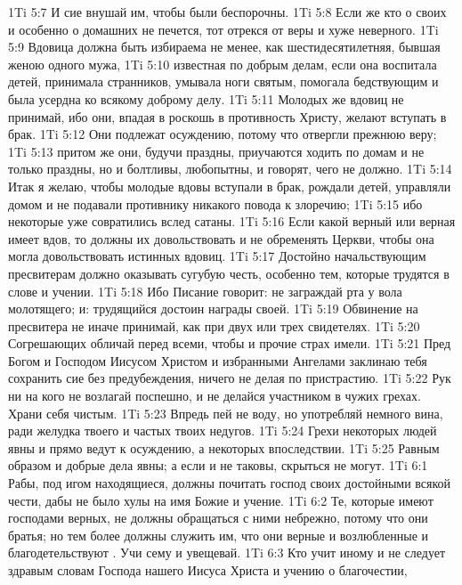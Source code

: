 \vs 1Ti 5:7 И сие внушай им, чтобы были беспорочны.
\vs 1Ti 5:8 Если же кто о своих и особенно о домашних не печется, тот отрекся от веры и хуже неверного.
\vs 1Ti 5:9 Вдовица должна быть избираема не менее, как шестидесятилетняя, бывшая женою одного мужа,
\vs 1Ti 5:10 известная по добрым делам, если она воспитала детей, принимала странников, умывала ноги святым, помогала бедствующим и была усердна ко всякому доброму делу.
\vs 1Ti 5:11 Молодых же вдовиц не принимай, ибо они, впадая в роскошь в противность Христу, желают вступать в брак.
\vs 1Ti 5:12 Они подлежат осуждению, потому что отвергли прежнюю веру;
\vs 1Ti 5:13 притом же они, будучи праздны, приучаются ходить по домам и  не только праздны, но и болтливы, любопытны, и говорят, чего не должно.
\vs 1Ti 5:14 Итак я желаю, чтобы молодые вдовы вступали в брак, рождали детей, управляли домом и не подавали противнику никакого повода к злоречию;
\vs 1Ti 5:15 ибо некоторые уже совратились вслед сатаны.
\vs 1Ti 5:16 Если какой верный или верная имеет вдов, то должны их довольствовать и не обременять Церкви, чтобы она могла довольствовать истинных вдовиц.
\rsbpar\vs 1Ti 5:17 Достойно начальствующим пресвитерам должно оказывать сугубую честь, особенно тем, которые трудятся в слове и учении.
\vs 1Ti 5:18 Ибо Писание говорит: не заграждай рта у вола молотящего; и: трудящийся достоин награды своей.
\vs 1Ti 5:19 Обвинение на пресвитера не иначе принимай, как при двух или трех свидетелях.
\vs 1Ti 5:20 Согрешающих обличай перед всеми, чтобы и прочие страх имели.
\rsbpar\vs 1Ti 5:21 Пред Богом и Господом Иисусом Христом и избранными Ангелами заклинаю тебя сохранить сие без предубеждения, ничего не делая по пристрастию.
\vs 1Ti 5:22 Рук ни на кого не возлагай поспешно, и не делайся участником в чужих грехах. Храни себя чистым.
\vs 1Ti 5:23 Впредь пей не  воду, но употребляй немного вина, ради желудка твоего и частых твоих недугов.
\vs 1Ti 5:24 Грехи некоторых людей явны и прямо ведут к осуждению, а некоторых  впоследствии.
\vs 1Ti 5:25 Равным образом и добрые дела явны; а если и не таковы, скрыться не могут.
\vs 1Ti 6:1 Рабы, под игом находящиеся, должны почитать господ своих достойными всякой чести, дабы не было хулы на имя Божие и учение.
\vs 1Ti 6:2 Те, которые имеют господами верных, не должны обращаться с ними небрежно, потому что они братья; но тем более должны служить им, что они верные и возлюбленные и благодетельствуют . Учи сему и увещевай.
\rsbpar\vs 1Ti 6:3 Кто учит иному и не следует здравым словам Господа нашего Иисуса Христа и учению о благочестии,
